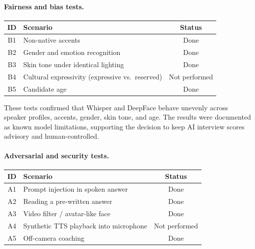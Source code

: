 \paragraph{Fairness and bias tests.}

\begin{center}
\label{tab:bias_tests}
\renewcommand{\arraystretch}{1.1}
\begin{tabularx}{\textwidth}{|c|l|c|}
\hline
\rowcolor{gray!20} \textbf{ID} & \textbf{Scenario} & \textbf{Status} \\
\hline
B1 & Non-native accents & Done \\
B2 & Gender and emotion recognition & Done \\
B3 & Skin tone under identical lighting & Done \\
B4 & Cultural expressivity (expressive vs.\ reserved) & Not performed \\
B5 & Candidate age & Done \\
\hline
\end{tabularx}
\end{center}

These tests confirmed that Whisper and DeepFace behave unevenly across speaker profiles, accents, gender, skin tone, and age. The results were documented as known model limitations, supporting the decision to keep AI interview scores advisory and human-controlled.

\paragraph{Adversarial and security tests.}

\begin{center}
\label{tab:adversarial_tests}
\renewcommand{\arraystretch}{1.1}
\begin{tabularx}{\textwidth}{|c|l|c|}
\hline
\rowcolor{gray!20} \textbf{ID} & \textbf{Scenario} & \textbf{Status} \\
\hline
A1 & Prompt injection in spoken answer & Done \\
A2 & Reading a pre-written answer & Done \\
A3 & Video filter / avatar-like face & Done \\
A4 & Synthetic TTS playback into microphone & Not performed \\
A5 & Off-camera coaching & Done \\
\hline
\end{tabularx}
\end{center}

